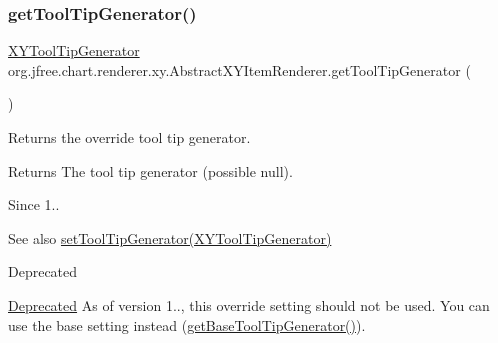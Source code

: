 \mbox{\label{classorg_1_1jfree_1_1chart_1_1renderer_1_1xy_1_1_abstract_x_y_item_renderer_a1ce6222e35dd81d42ace04ab0af423e1}} 
\subsubsection{\texorpdfstring{get\+Tool\+Tip\+Generator()}{getToolTipGenerator()}\hspace{0.1cm}{\footnotesize\ttfamily [2/2]}}
{\footnotesize\ttfamily \mbox{\hyperlink{interfaceorg_1_1jfree_1_1chart_1_1labels_1_1_x_y_tool_tip_generator}{X\+Y\+Tool\+Tip\+Generator}} org.\+jfree.\+chart.\+renderer.\+xy.\+Abstract\+X\+Y\+Item\+Renderer.\+get\+Tool\+Tip\+Generator (\begin{DoxyParamCaption}{ }\end{DoxyParamCaption})}

Returns the override tool tip generator.

\begin{DoxyReturn}{Returns}
The tool tip generator (possible {\ttfamily null}).
\end{DoxyReturn}
\begin{DoxySince}{Since}
1..
\end{DoxySince}
\begin{DoxySeeAlso}{See also}
\mbox{\hyperlink{classorg_1_1jfree_1_1chart_1_1renderer_1_1xy_1_1_abstract_x_y_item_renderer_afa8b73dbc8a04e692a889daac0a5327e}{set\+Tool\+Tip\+Generator(\+X\+Y\+Tool\+Tip\+Generator)}}
\end{DoxySeeAlso}
\begin{DoxyRefDesc}{Deprecated}
\item[\mbox{\hyperlink{deprecated__deprecated000202}{Deprecated}}]As of version 1.., this override setting should not be used. You can use the base setting instead (\mbox{\hyperlink{classorg_1_1jfree_1_1chart_1_1renderer_1_1xy_1_1_abstract_x_y_item_renderer_a9c3702b29c250e9f75066e367c65cd5a}{get\+Base\+Tool\+Tip\+Generator()}}). \end{DoxyRefDesc}
\mbox{\label{classorg_1_1jfree_1_1chart_1_1renderer_1_1xy_1_1_abstract_x_y_item_renderer_aa1506305a9de8a51ac84b1e520169ace}} 
